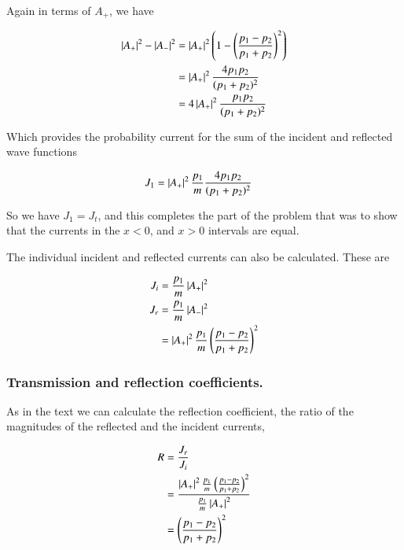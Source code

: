 \documentclass{article}
\begin{document}
Again in terms of $A_{+}$, we have

\begin{align*}
\left\lvert{A_{+} }\right\rvert^2 -\left\lvert{A_{-} }\right\rvert^2
&=
\left\lvert{A_{+}}\right\rvert^2 \left( 1 - \left( \frac{ p_1 - p_2 }{p_1 + p_2} \right)^2 \right) \\
&=
\left\lvert{A_{+}}\right\rvert^2
\frac{ 4 p_1 p_2 }{(p_1 + p_2)^2} \\
&=
4 \left\lvert{A_{+}}\right\rvert^2 \frac{ p_1 p_2 }{(p_1 + p_2)^2} \\
\end{align*}

Which provides the probability current for the sum of the incident and reflected wave functions

\begin{align}\label{eqn:current1}
J_1
&=
\left\lvert{A_{+}}\right\rvert^2
\frac{p_1}{m}
\frac{ 4 p_1 p_2 }{(p_1 + p_2)^2}
\end{align}

So we have $J_1 = J_t$, and this completes the 
part of the problem that was to show that the currents in the $x<0$, and $x>0$
intervals are equal.

The individual incident and reflected currents can also be calculated.  These are

\begin{align*}
J_i &= \frac{ p_1}{m} \left\lvert{ A_{+} }\right\rvert^2 \\
J_r &= \frac{ p_1}{m} \left\lvert{ A_{-} }\right\rvert^2  \\
&=
\left\lvert{ A_{+} }\right\rvert^2
\frac{ p_1 }{m }
\left( \frac{ p_1 - p_2 }{p_1 + p_2} \right)^2
\end{align*}


\subsubsection{ Transmission and reflection coefficients. }

As in the text we can calculate the reflection coefficient, the ratio of the magnitudes of the reflected and the incident currents,

\begin{align*}
R
&= \frac{J_r}{J_i}  \\
&=
\frac{\left\lvert{ A_{+} }\right\rvert^2
\frac{ p_1 }{m }
\left( \frac{ p_1 - p_2 }{p_1 + p_2} \right)^2 }{
\frac{ p_1}{m}
\left\lvert{ A_{+} }\right\rvert^2 } \\
&=
\left( \frac{ p_1 - p_2 }{p_1 + p_2} \right)^2
\\
\end{align*}
\end{document}

